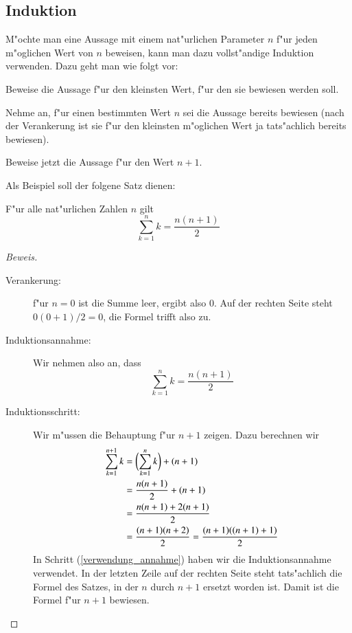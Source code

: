 \subsection{Induktion}
M"ochte man eine Aussage mit einem nat"urlichen Parameter $n$ f"ur jeden
m"oglichen Wert von $n$ beweisen, kann man dazu vollst"andige Induktion
verwenden. Dazu geht man wie folgt vor:
\begin{description}
\item[Verankerung:] Beweise die Aussage f"ur den kleinsten Wert,
f"ur den sie bewiesen werden soll.
\item[Induktionsannahme:] Nehme an, f"ur einen bestimmten Wert
$n$ sei die Aussage bereits bewiesen (nach der Verankerung ist sie 
f"ur den kleinsten m"oglichen Wert ja tats"achlich bereits bewiesen).
\item[Induktionsschritt:] Beweise jetzt die Aussage f"ur den Wert $n+1$.
\end{description}

Als Beispiel soll der folgene Satz dienen:

\begin{satz} F"ur alle nat"urlichen Zahlen $n$ gilt
\[
\sum_{k=1}^nk=\frac{n(n+1)}2
\]
\end{satz}
\begin{proof}[Beweis]
\begin{description}
\item[Verankerung:] f"ur $n=0$ ist die Summe leer, ergibt also $0$.
Auf der rechten Seite steht $0(0+1)/2=0$, die Formel trifft also zu.
\item[Induktionsannahme:]Wir nehmen also an, dass
\[
\sum_{k=1}^nk=\frac{n(n+1)}2
\]
\item[Induktionsschritt:] Wir m"ussen die Behauptung f"ur $n+1$ zeigen. Dazu
berechnen wir
\begin{align}
\sum_{k=1}^{n+1}k&=\biggl(\sum_{k=1}^nk\biggr) + (n+1)\notag\\
&=\frac{n(n+1)}2+(n+1)\label{verwendung_annahme}\\
&=\frac{n(n+1)+2(n+1)}2\notag\\
&=\frac{(n+1)(n+2)}2=\frac{(n+1)((n+1)+1)}2\notag
\end{align}
In Schritt (\ref{verwendung_annahme}) haben wir die Induktionsannahme
verwendet. In der letzten Zeile auf der rechten Seite steht tats"achlich
die Formel des Satzes, in der $n$ durch $n+1$ ersetzt worden ist.
Damit ist die Formel f"ur $n+1$ bewiesen.
\end{description}
\end{proof}
